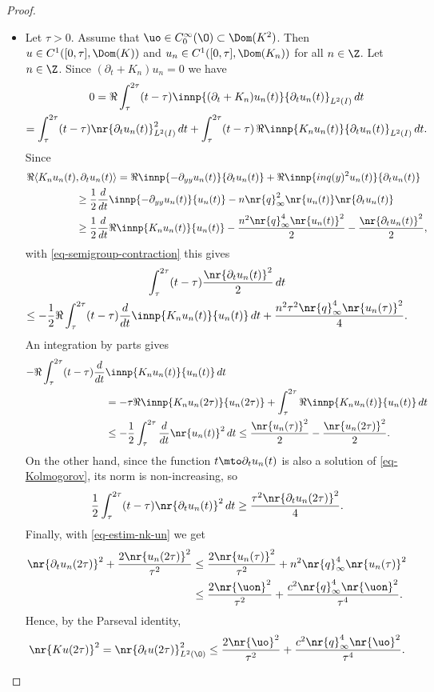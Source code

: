 \begin{proof}
\begin{itemize}
\item
Let $\tau > 0$. Assume that $\uo \in C_0^\infty(\O) \subset \Dom(K^2)$. Then $u \in C^1([0,\tau], \Dom(K))$ and $u_n \in C^1([0,\tau], \Dom(K_n))$ for all $n \in \Z$. Let $n \in \Z$. Since $(\partial_t + K_n) u_n = 0$ we have
\begin{multline*}
0 = \Re \int_\tau^{2\tau} (t-\tau) \innp{(\partial_t + K_n) u_n(t)}{\partial_t u_n(t)}_{L^2(I)} \, dt\\
= \int_\tau^{2\tau} (t-\tau) \nr{\partial_t u_n(t)}_{L^2(I)}^2 \, dt + \int_\tau^{2\tau} (t-\tau) \, \Re \innp{K_n u_n(t)}{\partial_t u_n(t)}_{L^2(I)} \, dt.
\end{multline*}
Since
\begin{align*}
\Re \langle K_n u_n(t)&,\partial_t u_n(t)\rangle = \Re \innp{-\partial_{yy} u_n(t)}{\partial_t u_n(t)} + \Re \innp{inq(y)^2 u_n(t)}{\partial_t u_n(t)}\\
& \geq \frac 12 \frac d {dt} \innp{-\partial_{yy} u_n(t)}{u_n(t)} - n \nr{q}_\infty^2 \nr{u_n(t)} \nr{\partial_t u_n(t)}\\
& \geq \frac 12 \frac d {dt} \Re \innp{K_n u_n(t)}{u_n(t)} - \frac {n^2 \nr{q}_\infty^4 \nr{u_n(t)}^2}2 - \frac {\nr{\partial_t u_n(t)}^2} 2,
\end{align*}
with \eqref{eq-semigroup-contraction} this gives
\begin{multline*}
\int_{\tau}^{2\tau} (t-\tau) \frac {\nr{\partial_t u_n(t)}^2} 2 \, dt\\
\leq - \frac 12 \Re \int_{\tau}^{2\tau} (t-\tau) \frac d {dt} \innp{K_n u_n(t)}{u_n(t)} \, dt + \frac {n^2 \tau^2 \nr{q}_\infty^4 \nr{u_n(\tau)}^2} 4.
\end{multline*}
An integration by parts gives
\begin{align*}
- \Re \int_\tau^{2\tau} (t-\tau) \frac d {dt}& \innp{K_n u_n(t)}{u_n(t)} \, dt\\
& = - \tau \Re \innp{K_n u_n(2\tau)}{u_n(2\tau)} + \int_\tau^{2\tau} \Re \innp{K_n u_n(t)}{u_n(t)} \, dt\\
& \leq - \frac 12 \int_\tau^{2\tau} \frac d {dt} \nr{u_n(t)}^2 \,dt \leq \frac {\nr{u_n(\tau)}^2} 2 - \frac {\nr{u_n(2\tau)}^2} 2.
\end{align*}
On the other hand, since the function $t \mto \partial_t u_n(t)$ is also a solution of \eqref{eq-Kolmogorov}, its norm is non-increasing, so
\[
\frac 12 \int_\tau^{2\tau} (t-\tau) \nr{\partial_t u_n(t)}^2 \, dt \geq \frac {\tau^2 \nr{\partial_t u_n(2 \tau)}^2} 4.
\]
Finally, with \eqref{eq-estim-nk-un} we get
\begin{align*}
\nr{\partial_t u_n(2 \tau)}^2 + \frac {2 \nr{u_n(2\tau)}^2}{\tau^2}
& \leq \frac {2 \nr{u_n(\tau)}^2}{\tau^2} + n^2 \nr{q}_\infty^4 \nr{u_n(\tau)}^2 \\
& \leq \frac {2 \nr{\uon}^2}{\tau^2} + \frac {c^2 \nr{q}_\infty^4 \nr{\uon}^2}{\tau^4}.
\end{align*}
Hence, by the Parseval identity,
\begin{equation} \label{eq-Ku-tau}
\nr{Ku(2\tau)}^2 = \nr{\partial_t u(2\tau)}_{L^2(\O)}^2 \leq \frac {2 \nr{\uo}^2}{\tau^2} + \frac {c^2 \nr{q}_\infty^4 \nr{\uo}^2}{\tau^4}.
\end{equation}


\end{itemize}
\end{proof}
